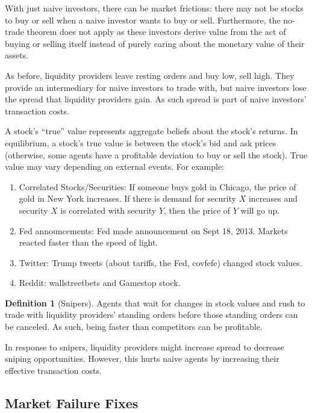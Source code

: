 \documentclass[dvipsnames]{article}
\theoremstyle{definition}
\newtheorem{definition}{Definition}[section]
\theoremstyle{remark}
\begin{document}
With just naive investors, there can be market frictions: there may not be stocks to buy or sell when a naive investor wants to buy or sell. Furthermore, the no-trade theorem does not apply as these investors derive value from the act of buying or selling itself instead of purely caring about the monetary value of their assets. 

As before, liquidity providers leave resting orders and buy low, sell high. They provide an intermediary for naive investors to trade with, but naive investors lose the spread that liquidity providers gain. As such spread is part of naive investors' transaction costs.

A stock's ``true'' value represents aggregate beliefs about the stock's returns. In equilibrium, a stock's true value is between the stock's bid and ask prices (otherwise, some agents have a profitable deviation to buy or sell the stock). True value may vary depending on external events. For example:
\begin{enumerate}
	\item Correlated Stocks/Securities: If someone buys gold in Chicago, the price of gold in New York increases. If there is demand for security $X$ increases and security $X$ is correlated with security $Y$, then the price of $Y$ will go up.
	\item Fed announcements: Fed made announcement on Sept 18, 2013. Markets reacted faster than the speed of light. 
	\item Twitter: Trump tweets (about tariffs, the Fed, covfefe) changed stock values.
	\item Reddit: wallstreetbets and Gamestop stock.
\end{enumerate} 

\begin{definition}[Snipers]
	Agents that wait for changes in stock values and rush to trade with liquidity providers' standing orders before those standing orders can be canceled. As such, being faster than competitors can be profitable. 
\end{definition}

In response to snipers, liquidity providers might increase spread to decrease sniping opportunities. However, this hurts naive agents by increasing their effective transaction costs.

\subsection{Market Failure Fixes}
\end{document}
